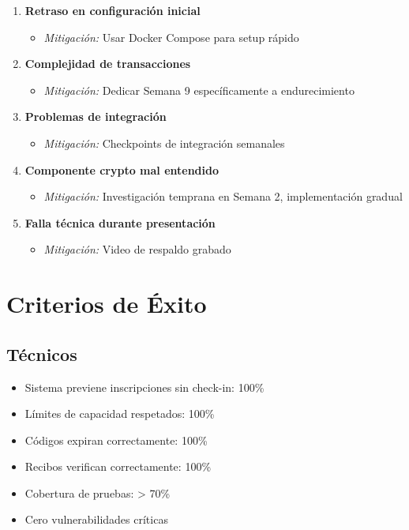 \documentclass[12pt,a4paper]{article}
\begin{document}
\begin{enumerate}
    \item \textbf{Retraso en configuración inicial}
    \begin{itemize}
        \item \textit{Mitigación:} Usar Docker Compose para setup rápido
    \end{itemize}
    
    \item \textbf{Complejidad de transacciones}
    \begin{itemize}
        \item \textit{Mitigación:} Dedicar Semana 9 específicamente a endurecimiento
    \end{itemize}
    
    \item \textbf{Problemas de integración}
    \begin{itemize}
        \item \textit{Mitigación:} Checkpoints de integración semanales
    \end{itemize}
    
    \item \textbf{Componente crypto mal entendido}
    \begin{itemize}
        \item \textit{Mitigación:} Investigación temprana en Semana 2, implementación gradual
    \end{itemize}
    
    \item \textbf{Falla técnica durante presentación}
    \begin{itemize}
        \item \textit{Mitigación:} Video de respaldo grabado
    \end{itemize}
\end{enumerate}

\section{Criterios de Éxito}

\subsection{Técnicos}

\begin{itemize}[leftmargin=*]
    \item Sistema previene inscripciones sin check-in: 100\%
    \item Límites de capacidad respetados: 100\%
    \item Códigos expiran correctamente: 100\%
    \item Recibos verifican correctamente: 100\%
    \item Cobertura de pruebas: > 70\%
    \item Cero vulnerabilidades críticas
\end{itemize}
\end{document}
